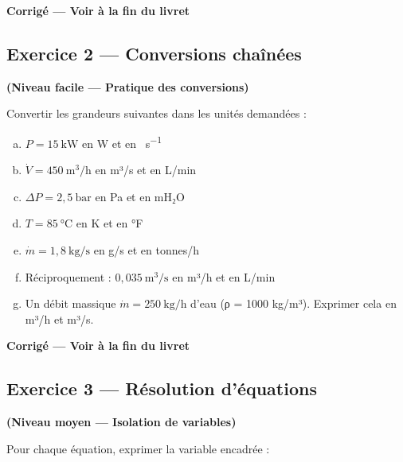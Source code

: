\textbf{Corrigé — Voir à la fin du livret}

\subsection*{Exercice 2 — Conversions chaînées}

\textbf{(Niveau facile — Pratique des conversions)}

Convertir les grandeurs suivantes dans les unités demandées :

\begin{enumerate}[a)]
  \item $P = 15~\mathrm{kW}$ en W et en \si{\calorie\per\second}

  \item $\dot{V} = 450~\mathrm{m^3/h}$ en m³/s et en L/min

  \item $\Delta P = 2{,}5~\mathrm{bar}$ en Pa et en mH₂O

  \item $T = 85~\mathrm{°C}$ en K et en °F

  \item $\dot{m} = 1{,}8~\mathrm{kg/s}$ en g/s et en tonnes/h

  \item Réciproquement : $0{,}035~\mathrm{m^3/s}$ en m³/h et en L/min

  \item Un débit massique $\dot{m} = 250~\mathrm{kg/h}$ d'eau (ρ = 1000 kg/m³). Exprimer cela en m³/h et m³/s.
\end{enumerate}

\textbf{Corrigé — Voir à la fin du livret}

\subsection*{Exercice 3 — Résolution d'équations}

\textbf{(Niveau moyen — Isolation de variables)}

Pour chaque équation, exprimer la variable encadrée :

